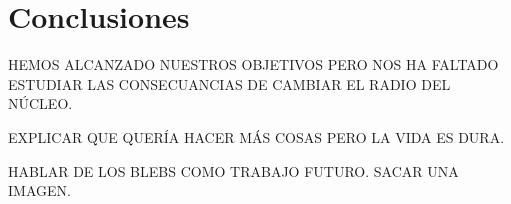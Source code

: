 \chapter{Conclusiones}
\label{cap:conclusions}

HEMOS ALCANZADO NUESTROS OBJETIVOS PERO NOS HA FALTADO ESTUDIAR LAS CONSECUANCIAS DE CAMBIAR EL RADIO DEL NÚCLEO.

EXPLICAR QUE QUERÍA HACER MÁS COSAS PERO LA VIDA ES DURA.

HABLAR DE LOS BLEBS COMO TRABAJO FUTURO. SACAR UNA IMAGEN.
